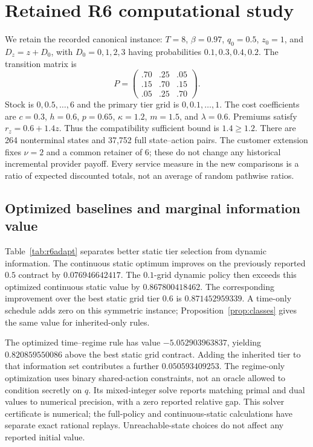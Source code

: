 \section{Retained R6 computational study}\label{ec:r6-study}
We retain the recorded canonical instance: $T=8$, $\beta=0.97$, $q_0=0.5$, $z_0=1$, and $D_z=z+D_0$, with $D_0=0,1,2,3$ having probabilities $0.1,0.3,0.4,0.2$. The transition matrix is
\[
 P=\begin{pmatrix}.70&.25&.05\\.15&.70&.15\\.05&.25&.70\end{pmatrix}.
\]
Stock is $0,0.5,\ldots,6$ and the primary tier grid is $0,0.1,\ldots,1$. The cost coefficients are $c=0.3$, $h=0.6$, $p=0.65$, $\kappa=1.2$, $m=1.5$, and $\lambda=0.6$. Premiums satisfy $r_z=0.6+1.4z$. Thus the compatibility sufficient bound is $1.4\geq1.2$. There are 264 nonterminal states and 37,752 full state--action pairs. The customer extension fixes $\nu=2$ and a common retainer of 6; these do not change any historical incremental provider payoff. Every service measure in the new comparisons is a ratio of expected discounted totals, not an average of random pathwise ratios.

\subsection{Optimized baselines and marginal information value}
Table~\ref{tab:r6adapt} separates better static tier selection from dynamic information. The continuous static optimum improves on the previously reported $0.5$ contract by $0.076946642417$. The $0.1$-grid dynamic policy then exceeds this optimized continuous static value by $0.867800418462$. The corresponding improvement over the best static grid tier $0.6$ is $0.871452959339$. A time-only schedule adds zero on this symmetric instance; Proposition~\ref{prop:classes} gives the same value for inherited-only rules.

The optimized time--regime rule has value $-5.052903963837$, yielding $0.820859550086$ above the best static grid contract. Adding the inherited tier to that information set contributes a further $0.050593409253$. The regime-only optimization uses binary shared-action constraints, not an oracle allowed to condition secretly on $q$. Its mixed-integer solve reports matching primal and dual values to numerical precision, with a zero reported relative gap. This solver certificate is numerical; the full-policy and continuous-static calculations have separate exact rational replays. Unreachable-state choices do not affect any reported initial value.


